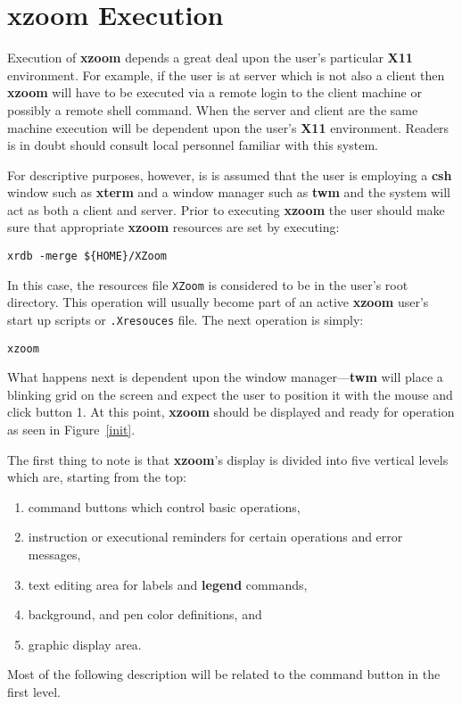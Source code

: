 \section{xzoom Execution}
Execution of {\bf xzoom} depends a great deal upon the user's
particular {\bf X11} environment.
For example, if the user is at server which is not also a client
then {\bf xzoom} will have to be executed via a remote login to
the client machine or possibly a remote shell command.
When the server and client are the same machine execution
will be dependent upon the user's {\bf X11} environment.
Readers is in doubt should consult local personnel familiar
with this system.
\begin{figure*}[h]
\vspace{1.5in}
\caption{Initial screen appearance of {\bf xzoom}.}
\label{init}
\end{figure*}

For descriptive purposes, however, is is assumed that the
user is employing a {\bf csh} window such as {\bf xterm}
and a window manager such as {\bf twm} and the system will act as
both a client and server.
Prior to executing {\bf xzoom} the user should make sure
that appropriate {\bf xzoom} resources are set by executing:
\begin{verbatim}
xrdb -merge ${HOME}/XZoom
\end{verbatim}
In this case, the resources file {\tt XZoom} is considered
to be in the user's root directory.
This operation will usually become part of an active {\bf xzoom} user's
start up scripts or {\tt .Xresouces} file.
The next operation is simply:
\begin{verbatim}
xzoom
\end{verbatim}
What happens next is dependent upon the window manager---{\bf twm}
will place a blinking grid on the screen and expect the user
to position it with the mouse and click button 1.
At this point, {\bf xzoom} should be displayed and ready for operation
as seen in Figure~\ref{init}.

The first thing to note is that {\bf xzoom}'s
display is divided into five vertical levels which are, starting from
the top:
\begin{enumerate}
\item command buttons which control basic operations,
\item instruction or executional reminders for certain operations
and error messages,
\item text editing area for labels and {\bf legend} commands,
\item background, and pen color definitions, and
\item graphic display area.
\end{enumerate}
Most of the following description will be related to the
command button in the first level.

